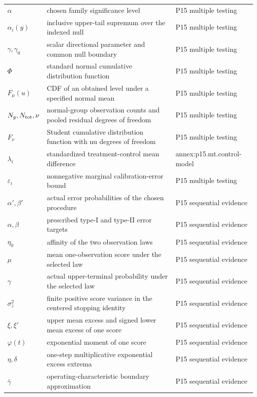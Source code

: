 \begin{longtable}{@{}p{}p{}p{}@{}}
\(\alpha\) & chosen family significance level & P15 multiple testing \\
\(\alpha_i(y)\) & inclusive upper-tail supremum over the indexed null & P15 multiple testing \\
\(\gamma,\allowbreak \gamma_0\) & scalar directional parameter and common null boundary & P15 multiple testing \\
\(\Phi\) & standard normal cumulative distribution function & P15 multiple testing \\
\(F_\mu(u)\) & CDF of an obtained level under a specified normal mean & P15 multiple testing \\
\(N_g,\allowbreak N_{\rm tot},\allowbreak \nu\) & normal-group observation counts and pooled residual degrees of freedom & P15 multiple testing \\
\(F_\nu\) & Student cumulative distribution function with nu degrees of freedom & P15 multiple testing \\
\(\lambda_i\) & standardized treatment-control mean difference & annex:\allowbreak{}p15.\allowbreak{}mt.\allowbreak{}control-\allowbreak{}model \\
\(\varepsilon_i\) & nonnegative marginal calibration-error bound & P15 multiple testing \\
\(\alpha',\allowbreak \beta'\) & actual error probabilities of the chosen procedure & P15 sequential evidence \\
\(\alpha,\allowbreak \beta\) & prescribed type-I and type-II error targets & P15 sequential evidence \\
\(\eta_0\) & affinity of the two observation laws & P15 sequential evidence \\
\(\mu\) & mean one-observation score under the selected law & P15 sequential evidence \\
\(\gamma\) & actual upper-terminal probability under the selected law & P15 sequential evidence \\
\(\sigma_z^2\) & finite positive score variance in the centered stopping identity & P15 sequential evidence \\
\(\xi,\allowbreak \xi'\) & upper mean excess and signed lower mean excess of one score & P15 sequential evidence \\
\(\varphi(t)\) & exponential moment of one score & P15 sequential evidence \\
\(\eta,\allowbreak \delta\) & one-step multiplicative exponential excess extrema & P15 sequential evidence \\
\(\bar\gamma\) & operating-characteristic boundary approximation & P15 sequential evidence \\

\end{longtable}
